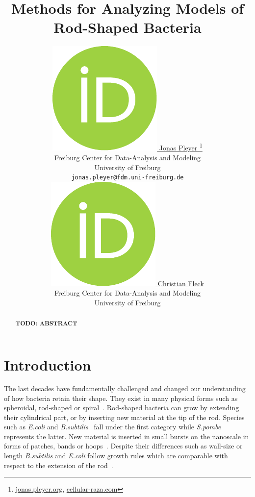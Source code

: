 \documentclass{article}
\title{Methods for Analyzing Models of\\ Rod-Shaped Bacteria}
\author{
    \href{https://orcid.org/0009-0001-0613-7978}{
        \includegraphics[scale=0.06]{figures/orcid.pdf}
        \hspace{1mm}Jonas Pleyer
    }
    \thanks{
        \href{https://jonas.pleyer.org}{jonas.pleyer.org},
        \href{https://cellular-raza.com}{cellular-raza.com}
    }\\
	Freiburg Center for Data-Analysis and Modeling\\
	University of Freiburg\\
	\texttt{jonas.pleyer@fdm.uni-freiburg.de} \\
	\And
	\href{https://orcid.org/0000-0002-6371-4495}{
        \includegraphics[scale=0.06]{figures/orcid.pdf}
        \hspace{1mm}Christian Fleck
    }\\
	Freiburg Center for Data-Analysis and Modeling\\
	University of Freiburg
}
\begin{document}
\maketitle


\begin{abstract}
    \textbf{TODO: ABSTRACT}
\end{abstract}


\pagebreak
\renewcommand{\contentsname}{Table of Contents (remove before submission)}
\tableofcontents
\pagebreak

\section{Introduction}
\label{section:introduction}

The last decades have fundamentally challenged and changed our understanding of how bacteria retain
their shape.
They exist in many physical forms such as spheroidal, rod-shaped or
spiral~\cite{Zapun2008,Young2006}.
Rod-shaped bacteria can grow by extending their cylindrical part, or by inserting new material at
the tip of the rod.
Species such as \textit{E.coli} and \textit{B.subtilis}~\cite{Errington2020} fall under the first
category while \textit{S.pombe} represents the latter.
New material is inserted in small bursts on the nanoscale in forms of patches, bands or
hoops~\cite{DePedro2003}.
Despite their differences such as wall-size or length \textit{B.subtilis} and \textit{E.coli} follow
growth rules which are comparable with respect to the extension of the rod~\cite{Chang2014}.
\end{document}

